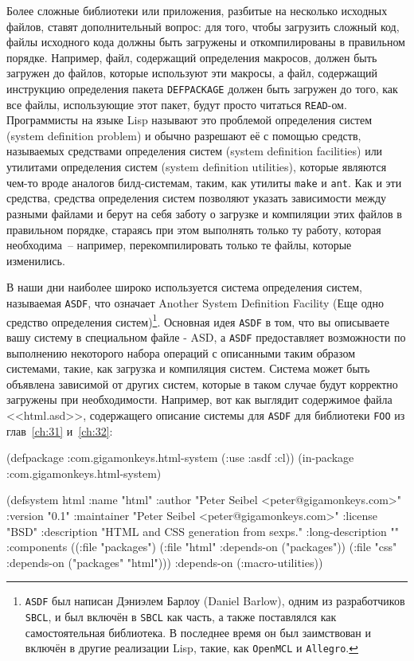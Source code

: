 Более сложные библиотеки или приложения, разбитые на несколько исходных файлов, ставят
дополнительный вопрос: для того, чтобы загрузить сложный код, файлы исходного кода должны
быть загружены и откомпилированы в правильном порядке. Например, файл, содержащий
определения макросов, должен быть загружен до файлов, которые используют эти макросы, а
файл, содержащий инструкцию определения пакета \lstinline{DEFPACKAGE} должен быть загружен до
того, как все файлы, использующие этот пакет, будут просто читаться
\lstinline{READ}-ом. Программисты на языке Lisp называют это проблемой определения систем
(system definition problem) и обычно разрешают её с помощью средств, называемых средствами
определения систем (system definition facilities) или утилитами определения систем (system
definition utilities), которые являются чем-то вроде аналогов билд-системам, таким, как
утилиты \lstinline{make} и \lstinline{ant}. Как и эти средства, средства определения систем
позволяют указать зависимости между разными файлами и берут на себя заботу о загрузке и
компиляции этих файлов в правильном порядке, стараясь при этом выполнять только ту работу,
которая необходима~-- например, перекомпилировать только те файлы, которые изменились.

В наши дни наиболее широко используется система определения систем, называемая
\lstinline{ASDF}, что означает Another System Definition Facility (Еще одно средство
определения систем)\footnote{\lstinline{ASDF} был написан Дэниэлем Барлоу (Daniel Barlow),
  одним из разработчиков \lstinline{SBCL}, и был включён в \lstinline{SBCL} как часть, а также
  поставлялся как самостоятельная библиотека. В последнее время он был заимствован и
  включён в другие реализации Lisp, такие, как \lstinline{OpenMCL} и \lstinline{Allegro}.}. Основная
идея \lstinline{ASDF} в том, что вы описываете вашу систему в специальном файле - ASD, а
\lstinline{ASDF} предоставляет возможности по выполнению некоторого набора операций с
описанными таким образом системами, такие, как загрузка и компиляция систем. Система может
быть объявлена зависимой от других систем, которые в таком случае будут корректно
загружены при необходимости. Например, вот как выглядит содержимое файла <<html.asd>>,
содержащего описание системы для \lstinline{ASDF} для библиотеки \lstinline{FOO} из глав~\ref{ch:31}
и~\ref{ch:32}:

\begin{myverb}
(defpackage :com.gigamonkeys.html-system (:use :asdf :cl))
(in-package :com.gigamonkeys.html-system)

(defsystem html
  :name "html"
  :author "Peter Seibel <peter@gigamonkeys.com>"
  :version "0.1"
  :maintainer "Peter Seibel <peter@gigamonkeys.com>"
  :license "BSD"
  :description "HTML and CSS generation from sexps."
  :long-description ""
  :components
  ((:file "packages")
   (:file "html" :depends-on ("packages"))
   (:file "css" :depends-on ("packages" "html")))
  :depends-on (:macro-utilities))
\end{myverb}


